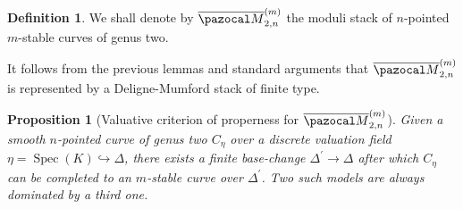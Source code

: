 \documentclass[11pt]{amsart}
\renewcommand{\to}{\rightarrow}
\newcommand{\oM}{\overline{\pazocal M}}
\newcommand{\dvr}{\Delta}
\theoremstyle{plain}
\newtheorem{prop}[thm]{Proposition}
\theoremstyle{definition}
\newtheorem{dfn}[thm]{Definition}
\begin{document}
\begin{dfn}
 We shall denote by $\oM^{(m)}_{2,n}$ the moduli stack of $n$-pointed $m$-stable curves of genus two.
\end{dfn}

It follows from the previous lemmas and standard arguments that $\oM^{(m)}_{2,n}$ is represented by a Deligne-Mumford stack of finite type.

\begin{prop}[Valuative criterion of properness for $\oM^{(m)}_{2,n}$]
 Given a smooth $n$-pointed curve of genus two $C_\eta$ over a discrete valuation field $\eta=\operatorname{Spec}(K)\hookrightarrow\dvr$, there exists a finite base-change $\dvr^\prime\to\dvr$ after which $C_\eta$ can be completed to an \emph{$m$-stable} curve over $\dvr^\prime$. Two such models are always dominated by a third one.
\end{prop}
\end{document}
